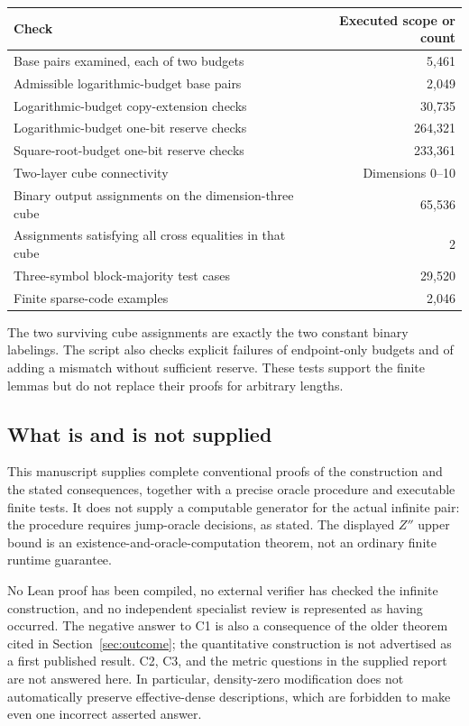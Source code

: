 \documentclass[11pt,a4paper]{article}
\theoremstyle{definition}\newtheorem{definition}[theorem]{Definition}
\theoremstyle{remark}\newtheorem{remark}[theorem]{Remark}
\begin{document}
\begin{center}
\small
\begin{tabularx}{\textwidth}{@{}Xr@{}}
\toprule
Check & Executed scope or count\\\midrule
Base pairs examined, each of two budgets & 5,461\\
Admissible logarithmic-budget base pairs & 2,049\\
Logarithmic-budget copy-extension checks & 30,735\\
Logarithmic-budget one-bit reserve checks & 264,321\\
Square-root-budget one-bit reserve checks & 233,361\\
Two-layer cube connectivity & Dimensions 0--10\\
Binary output assignments on the dimension-three cube & 65,536\\
Assignments satisfying all cross equalities in that cube & 2\\
Three-symbol block-majority test cases & 29,520\\
Finite sparse-code examples & 2,046\\
\bottomrule
\end{tabularx}
\end{center}

The two surviving cube assignments are exactly the two constant binary labelings. The script also checks explicit failures of endpoint-only budgets and of adding a mismatch without sufficient reserve. These tests support the finite lemmas but do not replace their proofs for arbitrary lengths.

\subsection{What is and is not supplied}
This manuscript supplies complete conventional proofs of the construction and the stated consequences, together with a precise oracle procedure and executable finite tests. It does not supply a computable generator for the actual infinite pair: the procedure requires jump-oracle decisions, as stated. The displayed $Z''$ upper bound is an existence-and-oracle-computation theorem, not an ordinary finite runtime guarantee.

No Lean proof has been compiled, no external verifier has checked the infinite construction, and no independent specialist review is represented as having occurred. The negative answer to C1 is also a consequence of the older theorem cited in Section~\ref{sec:outcome}; the quantitative construction is not advertised as a first published result. C2, C3, and the metric questions in the supplied report are not answered here. In particular, density-zero modification does not automatically preserve effective-dense descriptions, which are forbidden to make even one incorrect asserted answer.
\end{document}

